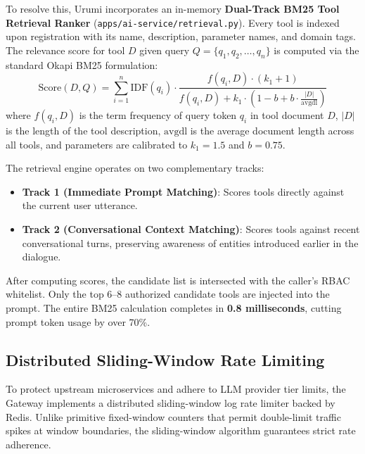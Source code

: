 \documentclass[11pt,a4paper]{article}
\begin{document}
\noindent To resolve this, Urumi incorporates an in-memory \textbf{Dual-Track BM25 Tool Retrieval Ranker} (\texttt{apps/ai-service/retrieval.py}). Every tool is indexed upon registration with its name, description, parameter names, and domain tags. The relevance score for tool $D$ given query $Q = \{q_1, q_2, \dots, q_n\}$ is computed via the standard Okapi BM25 formulation:
\begin{equation}
\text{Score}(D, Q) = \sum_{i=1}^n \text{IDF}(q_i) \cdot \frac{f(q_i, D) \cdot (k_1 + 1)}{f(q_i, D) + k_1 \cdot \left(1 - b + b \cdot \frac{|D|}{\text{avgdl}}\right)}
\end{equation}
where $f(q_i, D)$ is the term frequency of query token $q_i$ in tool document $D$, $|D|$ is the length of the tool description, $\text{avgdl}$ is the average document length across all tools, and parameters are calibrated to $k_1 = 1.5$ and $b = 0.75$.

\noindent The retrieval engine operates on two complementary tracks:
\begin{itemize}[leftmargin=*]
    \item \textbf{Track 1 (Immediate Prompt Matching)}: Scores tools directly against the current user utterance.
    \item \textbf{Track 2 (Conversational Context Matching)}: Scores tools against recent conversational turns, preserving awareness of entities introduced earlier in the dialogue.
\end{itemize}
After computing scores, the candidate list is intersected with the caller's RBAC whitelist. Only the top 6--8 authorized candidate tools are injected into the prompt. The entire BM25 calculation completes in \textbf{0.8 milliseconds}, cutting prompt token usage by over 70\%.

\subsection{Distributed Sliding-Window Rate Limiting}
To protect upstream microservices and adhere to LLM provider tier limits, the Gateway implements a distributed sliding-window log rate limiter backed by Redis. Unlike primitive fixed-window counters that permit double-limit traffic spikes at window boundaries, the sliding-window algorithm guarantees strict rate adherence.
\end{document}
